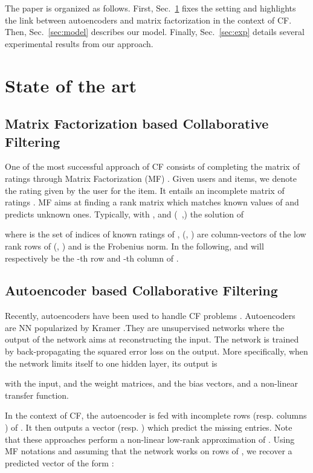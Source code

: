 \documentclass{article}
\begin{document}
The paper is organized as follows. First, Sec.~\ref{sec:preliminaries} fixes the setting and highlights the link between autoencoders and matrix factorization in the context of CF. Then, Sec.~\ref{sec:model} describes our model. Finally, Sec.~\ref{sec:exp} details several experimental results from our approach.

\section{State of the art}
\label{sec:preliminaries}

\subsection{Matrix Factorization based Collaborative Filtering}
One of the most successful approach of CF consists of completing the matrix of ratings through Matrix Factorization (MF) \cite{Koren2009}.
Given  users and  items, we denote  the rating given by the   user for the  item. 
It entails an incomplete matrix of ratings . 
MF aims at finding a rank  matrix  which matches known values of  and predicts unknown ones. Typically,  with ,  and  (~,) the solution of
  
where 
  is the set of indices of known ratings of ,
 (, ) are column-vectors of the low rank rows of (, ) and 
  is the Frobenius norm.
In the following,  and  will respectively be the -th row  and -th column of .

\subsection{Autoencoder based Collaborative Filtering}

Recently, autoencoders have been used to handle CF problems \cite{Sedhain2015,Strub2015}.
Autoencoders are NN popularized by Kramer \cite{Kramer1991}.They are unsupervised networks where the output of the network aims at reconstructing the input.
The network is trained by back-propagating the squared error loss on the output.
More specifically, when the network limits itself to one hidden layer, its output is

with  the input,  and  the weight
matrices,  and  the
bias vectors, and  a non-linear transfer function.


In the context of CF, the autoencoder is fed with incomplete rows  (resp. columns ) of  \cite{Sedhain2015,Strub2015}. It then outputs a vector  (resp. ) which predict the missing entries.
Note that these approaches perform a non-linear low-rank approximation of .
Using MF notations and assuming that the network works on rows  of , we recover a predicted vector  of the form :
\end{document}
